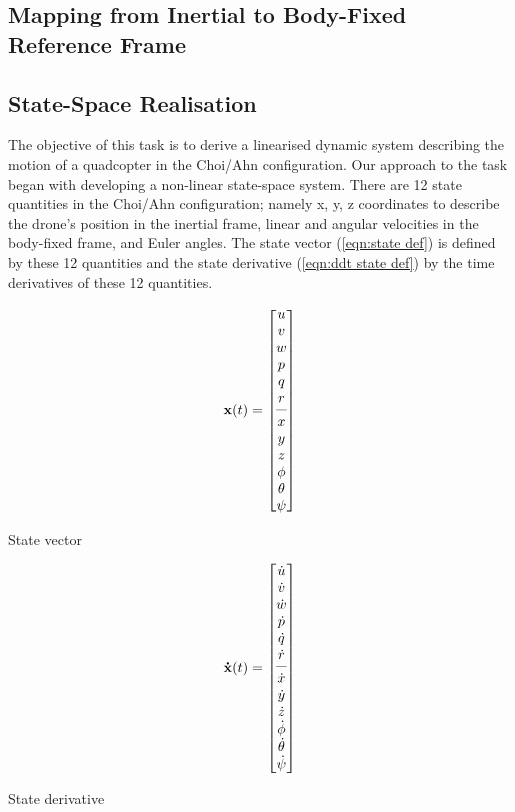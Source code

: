 \subsection{Mapping from Inertial to Body-Fixed Reference Frame}

\subsection{State-Space Realisation}
The objective of this task is to derive a linearised dynamic system describing the motion of a quadcopter in the Choi/Ahn configuration. Our approach to the task began with developing a non-linear state-space system. There are 12 state quantities in the Choi/Ahn configuration; namely x, y, z coordinates to describe the drone's position in the inertial frame, linear and angular velocities in the body-fixed frame, and Euler angles. The state vector (\cref{eqn:state def}) is defined by these 12 quantities and the state derivative (\cref{eqn:ddt state def}) by the time derivatives of these 12 quantities.
\begin{captioneq}[htb]
	\begin{equation}\label{eqn:state def}
\mstate=\begin{bmatrix}u\\v\\w\\p\\q\\r\\\cmidrule(lr){1-1 } x\\y\\z\\\phi\\\theta\\\psi\end{bmatrix}
\end{equation}
\caption{State vector}
\end{captioneq}
\begin{captioneq}[htb]
\begin{equation}\label{eqn:ddt state def}
\mdstate=\begin{bmatrix}\dot{u}\\\dot{v}\\\dot{w}\\\dot{p}\\\dot{q}\\\dot{r}\\\cmidrule(lr){1-1} \dot{x}\\\dot{y}\\\dot{z}\\\dot{\phi}\\\dot{\theta}\\\dot{\psi}\end{bmatrix}
\end{equation}
\caption{State derivative}
\end{captioneq}


